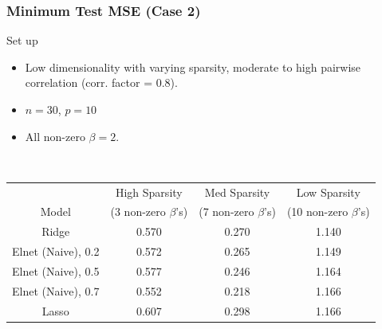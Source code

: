 \begin{frame}[fragile]
\frametitle{Minimum Test MSE (Case 2)}

\begin{block}{Set up}
    \begin{itemize}
        \item Low dimensionality with varying sparsity, moderate to high pairwise correlation (corr. factor = 0.8).  
        \item $n = 30$, $p = 10$
        \item All non-zero $\beta = 2$. 
    \end{itemize}
\end{block} \\

\begin{center}
    
    \begin{tabular}{||c c c c||} 
         \hline
          & High Sparsity & Med Sparsity & Low Sparsity \\ [0.5ex] 
          Model & (3 non-zero $\beta$'s) & (7 non-zero $\beta$'s) & (10 non-zero $\beta$'s) \\ [0.5ex]
         \hline\hline
         Ridge & 0.570 & 0.270 & \cellcolor{pink!60}1.140 \\ 
         \hline
         Elnet (Naive), 0.2 & 0.572 & 0.265 & 1.149 \\
         \hline
         Elnet (Naive), 0.5 & 0.577 & 0.246 & 1.164\\
        \hline
         Elnet (Naive), 0.7 & \cellcolor{pink!60}0.552 & \cellcolor{pink!60}0.218 & 1.166\\
        \hline
         Lasso & 0.607 & 0.298 & 1.166\\
        \hline
    \end{tabular}

\end{center}
\end{frame}
